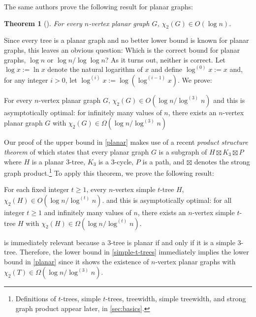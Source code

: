 \documentclass[kpfonts]{patmorin}
\newcommand{\trn}{\chi_2}
\newtheorem{othertheorem}{Theorem}
\theoremstyle{named}
\begin{document}
The same authors prove the following result for planar graphs:

\setcounter{othertheorem}{15}
\begin{othertheorem}[\cite{karpas.neiman.ea:on}]\label{planar-graphs}
    For every $n$-vertex planar graph $G$, $\trn(G)\in O(\log n)$.
\end{othertheorem}

Since every tree is a planar graph and no better lower bound is known for planar graphs, this leaves an obvious question:  Which is the correct bound for planar graphs, $\log n$ or $\log n/\log\log n$?  As it turns out, neither is correct.  Let $\log x :=\ln x$ denote the natural logarithm of $x$ and define $\log^{(0)}x:=x$ and, for any integer $i>0$, let $\log^{(i)}x:=\log(\log^{(i-1)} x)$. We prove:


\begin{thm}\label{planar}
    For every $n$-vertex planar graph $G$, $\trn(G)\in O(\log n/\log^{(3)} n)$ and this is asymptotically optimal: for infinitely many values of $n$, there exists an $n$-vertex planar graph $G$ with $\trn(G)\in \Omega(\log n/\log^{(3)} n)$
\end{thm}

Our proof of the upper bound in \cref{planar} makes use of a recent \emph{product structure theorem} of \citet{dujmovic.joret.ea:planar} which states that every planar graph $G$ is a subgraph of $H\boxtimes K_3\boxtimes P$ where $H$ is a planar $3$-tree, $K_3$ is a 3-cycle, $P$ is a path, and $\boxtimes$ denotes the strong graph product.\footnote{Definitions of $t$-trees, simple $t$-trees, treewidth, simple treewidth, and strong graph product appear later, in \cref{sec:basics}.}  To apply this theorem, we prove the following result:

\begin{thm}\label{simple-t-trees}
    For each fixed integer $t\ge 1$, every $n$-vertex simple $t$-tree $H$, $\trn(H) \in O(\log n/\log^{(t)}n)$.
    and this is asymptotically optimal: for all integer $t\ge 1$ and infinitely many values of $n$, there exists an $n$-vertex simple $t$-tree $H$ with $\trn(H)\in\Omega(\log n/\log^{(t)} n)$.
\end{thm}

 is immediately relevant because a 3-tree is planar if and only if it is a simple $3$-tree. Therefore, the lower bound in \cref{simple-t-trees} immediately implies the lower bound in \cref{planar} since it shows the existence of $n$-vertex planar graphs with $\trn(T)\in\Omega(\log n/\log^{(3)} n)$.
\end{document}
